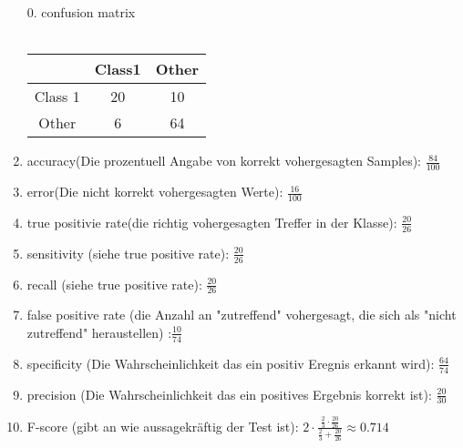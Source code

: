 \begin{enumerate}
	\item[0.] confusion matrix \\ \ \\
		\begin{tabular}{|c|c|c|}
		\hline
		 & Class1 & Other \\
		\hline
		Class 1& 20 & 10 \\
		\hline
		Other & 6 & 64 \\
		\hline
		\end{tabular}
	\item accuracy(Die prozentuell Angabe von korrekt vohergesagten Samples): $\frac{84}{100}$

	\item error(Die nicht korrekt vohergesagten Werte): $\frac{16}{100}$
	
	\item true positivie rate(die richtig vohergesagten Treffer in der Klasse): $\frac{20}{26}$

	\item sensitivity (siehe true positive rate): $\frac{20}{26}$

	\item recall (siehe true positive rate): $\frac{20}{26}$

	\item false positive rate (die Anzahl an "zutreffend" vohergesagt, die sich als "nicht zutreffend" heraustellen) :$\frac{10}{74}$

	\item specificity (Die Wahrscheinlichkeit das ein positiv Eregnis erkannt wird): $\frac{64}{74}$

	\item precision (Die Wahrscheinlichkeit das ein positives Ergebnis korrekt ist): $\frac{20}{30}$

	\item F-score (gibt an wie aussagekräftig der Test ist): $2 \cdot \frac{\frac{2}{3} \cdot \frac{20}{26}}{\frac{2}{3} + \frac{20}{26}} \approx 0.714$

\end{enumerate}
